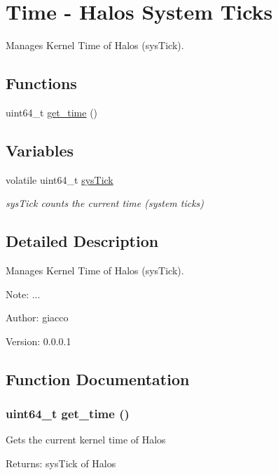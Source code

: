 \hypertarget{group___t_i_m_e}{
\section{Time - Halos System Ticks}
\label{group___t_i_m_e}
}
Manages Kernel Time of Halos (sysTick).  


\subsection*{Functions}
\begin{CompactItemize}
\item 
uint64\_\-t \hyperlink{group___t_i_m_e_g13abe410ceba31fb3039098f5ebb9bf5}{get\_\-time} ()
\end{CompactItemize}
\subsection*{Variables}
\begin{CompactItemize}
\item 
\hypertarget{group___t_i_m_e_g8b740eac1e4ec70aa17b71fbd26e62dc}{
volatile uint64\_\-t \hyperlink{group___t_i_m_e_g8b740eac1e4ec70aa17b71fbd26e62dc}{sysTick}}
\label{group___t_i_m_e_g8b740eac1e4ec70aa17b71fbd26e62dc}

\begin{CompactList}\small\item\em sysTick counts the current time (system ticks) \item\end{CompactList}\end{CompactItemize}


\subsection{Detailed Description}
Manages Kernel Time of Halos (sysTick). 

\begin{Desc}
\item[Note:]... \end{Desc}
\begin{Desc}
\item[Author:]giacco \end{Desc}
\begin{Desc}
\item[Version:]0.0.0.1 \end{Desc}


\subsection{Function Documentation}
\hypertarget{group___t_i_m_e_g13abe410ceba31fb3039098f5ebb9bf5}{
\subsubsection[{get\_\-time}]{\setlength{\rightskip}{0pt plus 5cm}uint64\_\-t get\_\-time ()}}
\label{group___t_i_m_e_g13abe410ceba31fb3039098f5ebb9bf5}


Gets the current kernel time of Halos \begin{Desc}
\item[Returns:]sysTick of Halos \end{Desc}
